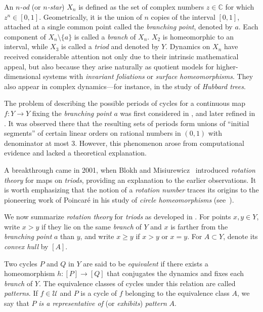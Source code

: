 \documentclass[12pt,reqno]{amsart}
\theoremstyle{definition}
\theoremstyle{remark}
\theoremstyle{assumption}
\numberwithin{equation}{section}
\begin{document}
An \emph{$n$-od} (or \emph{$n$-star}) $X_n$ is defined as the set of complex numbers $z\in\mathbb{C}$ for which $z^n\in[0,1]$.  
Geometrically, it is the union of $n$ copies of the interval $[0,1]$, attached at a single common point called the \emph{branching point}, denoted by $a$.  
Each component of $X_n \setminus\{a\}$ is called a \emph{branch} of $X_n$. $X_2$ is homeomorphic to an interval, while $X_3$ is called a \emph{triod} and denoted by $Y$.  
Dynamics on $X_n$ have received considerable attention not only due to their intrinsic mathematical appeal, but also because they arise naturally as quotient models for higher-dimensional systems with \emph{invariant foliations} or \emph{surface homeomorphisms}.  They also appear in complex dynamics---for instance, in the study of \emph{Hubbard trees}. 

The problem of describing the possible periods of cycles for a continuous map $f:Y\to Y$ fixing the \emph{branching point} $a$ was first considered in \cite{alm98,Ba}, and later refined in \cite{almnew}.  
It was observed there that the resulting sets of periods form unions of ``initial segments'' of certain linear orders on rational numbers in $(0,1)$ with denominator at most $3$.  
However, this phenomenon arose from computational evidence and lacked a theoretical explanation.

A breakthrough came in 2001, when Blokh and Misiurewicz~\cite{BMR} introduced  \emph{rotation theory} for maps on \emph{triods}, providing an explanation to the earlier observations. It is worth emphasizing that the notion of a \emph{rotation number} traces its origins to the pioneering work of Poincar\'e in his study of \emph{circle homeomorphisms} (see~\cite{poi}).




We now summarize \emph{rotation theory} for \emph{triods} as developed in \cite{BMR}.  
For points $x,y\in Y$, write $x>y$ if they lie on the same \emph{branch} of $Y$ and $x$ is farther from the \emph{branching point} $a$ than $y$, and write $x\geqslant  y$ if $x>y$ or $x=y$.  
For $A\subset Y$, denote its \emph{convex hull} by $[A]$.



Two cycles $P$ and $Q$ in $Y$ are said to be \emph{equivalent} if there exists a homeomorphism $h:[P]\to[Q]$ that conjugates the dynamics and fixes each \emph{branch} of $Y$.   
The equivalence classes of cycles under this relation are called \emph{patterns}.  
If $f\in\mathcal{U}$ and $P$ is a cycle of $f$ belonging to the equivalence class $A$, we say that $P$ \emph{is a representative of} (or \emph{exhibits})  \emph{pattern} $A$.  
\end{document}
